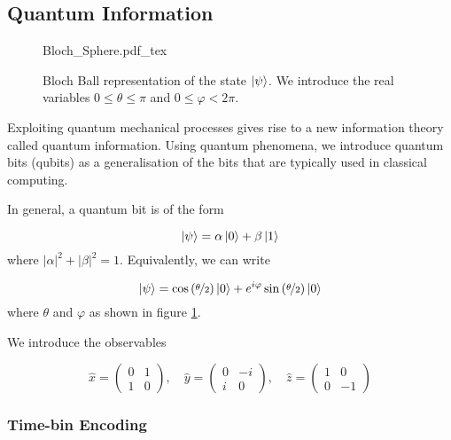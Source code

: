 \subsection{Quantum Information}

\begin{figure}
	\centering
	\def\svgwidth{0.4\textwidth}
   	{Bloch_Sphere.pdf_tex}
   	\caption[Bloch sphere representation of a qubit]{Bloch Ball representation of the state $\ket{\psi}$. We introduce the real variables $0\le\theta\le\pi$ and $0\le\varphi<2\pi$.}
   	\label{fig:bloch}
\end{figure}

Exploiting quantum mechanical processes gives rise to a new information theory called {\textcolor{bristol-red} quantum information}. Using quantum phenomena, we introduce quantum bits (qubits) as a generalisation of the bits that are typically used in classical computing.

In general, a quantum bit is of the form 

\begin{equation}
	\ket{\psi} = \alpha\ket{0} + \beta\ket{1}
\end{equation}
where $|\alpha|^2 + |\beta|^2 = 1$. Equivalently, we can write

\begin{equation}
	\ket{\psi} = \cos\left(\nicefrac{\theta}{2}\right)\ket{0} + e^{i\varphi}\sin\left(\nicefrac{\theta}{2}\right)\ket{0}
\end{equation}
where $\theta$ and $\varphi$ as shown in figure \ref{fig:bloch}.

We introduce the observables 

\begin{equation}
	\hat{x} = \left(\begin{matrix}
		0 & 1 \\
		1 & 0
	\end{matrix}\right),
	\quad
	\hat{y} = \left(\begin{matrix}
		0 & -i \\
		i & 0
	\end{matrix}\right),
	\quad
	\hat{z} = \left(\begin{matrix}
		1 & 0 \\
		0 & -1
	\end{matrix}\right)
\end{equation}

\subsubsection{Time-bin Encoding}

